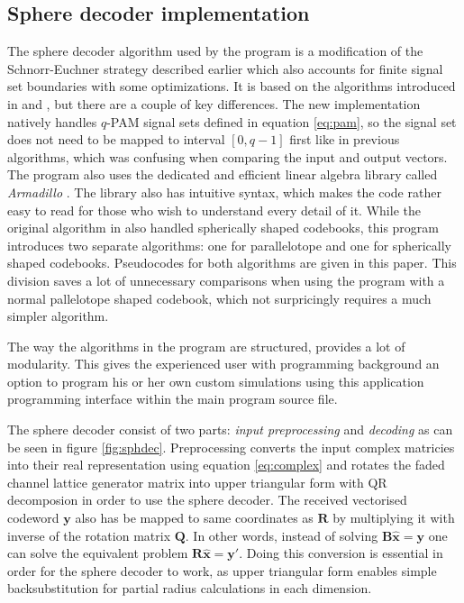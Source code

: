 \documentclass[english,12pt,a4paper,pdftex,sci,utf8]{aaltothesis}
\begin{document}
\subsection{Sphere decoder implementation}
The sphere decoder algorithm used by the program is a modification of the Schnorr-Euchner strategy described earlier which also accounts for finite signal set boundaries with some optimizations. It is based on the algorithms introduced in \cite{mia} and \cite{ranto}, but there are a couple of key differences. The new implementation natively handles $q$-PAM signal sets defined in equation \eqref{eq:pam}, so the signal set does not need to be mapped to interval $[0,q-1]$ first like in previous algorithms, which was confusing when comparing the input and output vectors. The program also uses the dedicated and efficient linear algebra library called \emph{Armadillo} \cite{arma}. The library also has intuitive syntax, which makes the code rather easy to read for those who wish to understand every detail of it. While the original algorithm in \cite{ranto} also handled spherically shaped codebooks, this program introduces two separate algorithms: one for parallelotope and one for spherically shaped codebooks. Pseudocodes for both algorithms are given in this paper. This division saves a lot of unnecessary comparisons when using the program with a normal pallelotope shaped codebook, which not surpricingly requires a much simpler algorithm. 
\par The way the algorithms in the program are structured, provides a lot of modularity. This gives the experienced user with programming background an option to program his or her own custom simulations using this application programming interface within the main program source file.
\par The sphere decoder consist of two parts: \emph{input preprocessing} and \emph{decoding} as can be seen in figure \ref{fig:sphdec}. Preprocessing converts the input complex matricies into their real representation using equation \eqref{eq:complex} and rotates the faded channel lattice generator matrix into upper triangular form with QR decomposion in order to use the sphere decoder. The received vectorised codeword $\textbf{y}$ also has be mapped to same coordinates as $\textbf{R}$ by multiplying it with inverse of the rotation matrix $\textbf{Q}$. In other words, instead of solving $\mathbf{B\hat{x}}=\mathbf{y}$ one can solve the equivalent problem $\mathbf{R\hat{x}}=\mathbf{y'}$. Doing this conversion is essential in order for the sphere decoder to work, as upper triangular form enables simple backsubstitution for partial radius calculations in each dimension.
\end{document}
